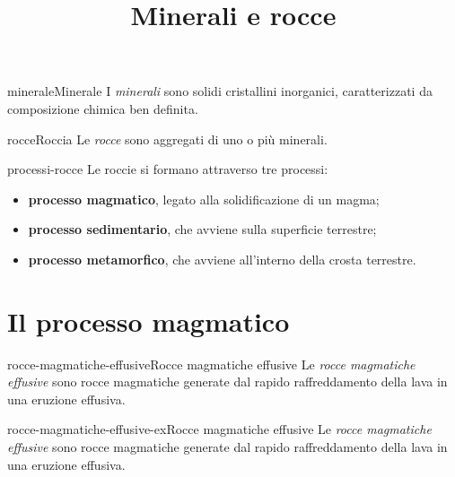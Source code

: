 \documentclass[preview]{standalone}
\begin{document}
\title{Minerali e rocce}
\genpage

\begin{snippetdefinition}{minerale}{Minerale}
    I \textit{minerali} sono solidi cristallini inorganici, caratterizzati da composizione chimica ben definita.
\end{snippetdefinition}

\begin{snippetdefinition}{rocce}{Roccia}
    Le \textit{rocce} sono aggregati di uno o più minerali.
\end{snippetdefinition}

\begin{snippet}{processi-rocce}
    Le roccie si formano attraverso tre processi:
    \begin{itemize}
        \item \textbf{processo magmatico}, legato alla solidificazione di un magma;
        \item \textbf{processo sedimentario}, che avviene sulla superficie terrestre;
        \item \textbf{processo metamorfico}, che avviene all'interno della crosta terrestre.
    \end{itemize}
\end{snippet}

\section{Il processo magmatico}


\begin{snippetdefinition}{rocce-magmatiche-effusive}{Rocce magmatiche effusive}
    Le \textit{rocce magmatiche effusive} sono rocce magmatiche generate dal rapido raffreddamento
    della lava in una eruzione effusiva.
\end{snippetdefinition}

\begin{snippetexample}{rocce-magmatiche-effusive-ex}{Rocce magmatiche effusive}
    Le \textit{rocce magmatiche effusive} sono rocce magmatiche generate dal rapido raffreddamento
    della lava in una eruzione effusiva.
\end{snippetexample}
\end{document}
